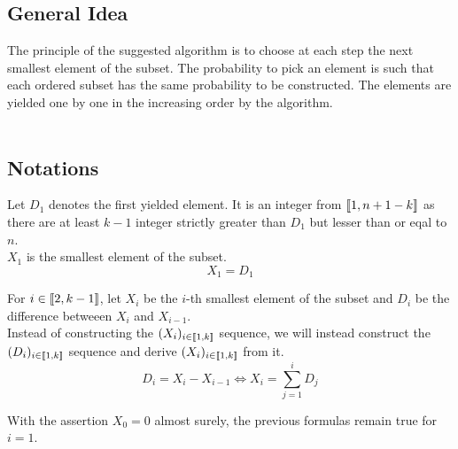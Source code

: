 \subsection{General Idea}
	The principle of the suggested algorithm is to choose at each step the next smallest element of the subset. The probability to pick an element is such that each ordered subset has the same probability to be constructed. The elements are yielded one by one in the increasing order by the algorithm.\\\

\subsection{Notations}
Let $D_1$ denotes the first yielded element. It is an integer from $\llbracket1, n + 1 - k\rrbracket$ as there are at least $k - 1$ integer strictly greater than $D_1$ but lesser than or eqal to $n$.\\
$X_1$ is the smallest element of the subset.
\[X_1 = D_1\]

For $i\in\llbracket2, k - 1\rrbracket$, let $X_i$ be the $i$-th smallest element of the subset and $D_i$ be the difference betweeen $X_{i}$ and $X_{i - 1}$.\\
Instead of constructing the $(X_i)_{i\in\llbracket1, k\rrbracket}$ sequence, we will instead construct the $(D_i)_{i\in\llbracket1, k\rrbracket}$ sequence and derive $(X_i)_{i\in\llbracket1, k\rrbracket}$ from it.
\[D_i = X_i - X_{i - 1} \Leftrightarrow X_i = \sum_{j = 1}^{i}{D_j}\]

With the assertion $X_0 = 0$ almost surely, the previous formulas remain true for $i = 1$.

